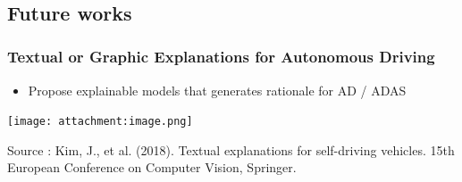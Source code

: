 \documentclass[11pt]{article}
\providecommand{\tightlist}{%
      \setlength{\itemsep}{0pt}\setlength{\parskip}{0pt}}
\begin{document}
    \begin{center}
    \end{center}
    { \hspace*{\fill} \\}
    
    \subsection{Future works}\label{future-works}

\subsubsection{Textual or Graphic Explanations for Autonomous
Driving}\label{textual-or-graphic-explanations-for-autonomous-driving}

\begin{itemize}
\tightlist
\item
  Propose explainable models that generates rationale for AD / ADAS
\end{itemize}

\texttt{[image: attachment:image.png]}

Source : Kim, J., et al. (2018). Textual explanations for self-driving
vehicles. 15th European Conference on Computer Vision, Springer.


    
    
    
    
\end{document}
